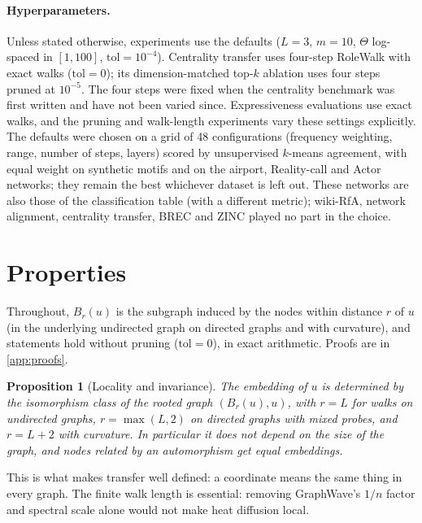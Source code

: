 \documentclass[10pt]{article}
\newtheorem{proposition}{Proposition}
\theoremstyle{definition}
\newcommand{\tol}{\mathrm{tol}}
\newcommand{\Th}{\Theta}
\begin{document}
\paragraph{Hyperparameters.}
Unless stated otherwise, experiments use the defaults ($L=3$, $m=10$, $\Th$ log-spaced in $[1,100]$, $\tol=10^{-4}$). Centrality transfer uses four-step RoleWalk with exact walks ($\tol=0$); its dimension-matched top-$k$ ablation uses four steps pruned at $10^{-5}$. The four steps were fixed when the centrality benchmark was first written and have not been varied since. Expressiveness evaluations use exact walks, and the pruning and walk-length experiments vary these settings explicitly.
The defaults were chosen on a grid of 48 configurations (frequency weighting, range, number of steps, layers) scored by unsupervised $k$-means agreement, with equal weight on synthetic motifs and on the airport, Reality-call and Actor networks; they remain the best whichever dataset is left out.
These networks are also those of the classification table (with a different metric); wiki-RfA, network alignment, centrality transfer, BREC and ZINC played no part in the choice.

\section{Properties}\label{sec:theory}

Throughout, $B_r(u)$ is the subgraph induced by the nodes within distance $r$ of $u$ (in the underlying undirected graph on directed graphs and with curvature), and statements hold without pruning ($\tol=0$), in exact arithmetic. Proofs are in \cref{app:proofs}.

\begin{proposition}[Locality and invariance]\label{prop:local}
The embedding of $u$ is determined by the isomorphism class of the rooted graph $(B_r(u),u)$, with $r=L$ for walks on undirected graphs, $r=\max(L,2)$ on directed graphs with mixed probes, and $r=L+2$ with curvature.
In particular it does not depend on the size of the graph, and nodes related by an automorphism get equal embeddings.
\end{proposition}

This is what makes transfer well defined: a coordinate means the same thing in every graph. The finite walk length is essential: removing GraphWave's $1/n$ factor and spectral scale alone would not make heat diffusion local.
\end{document}
